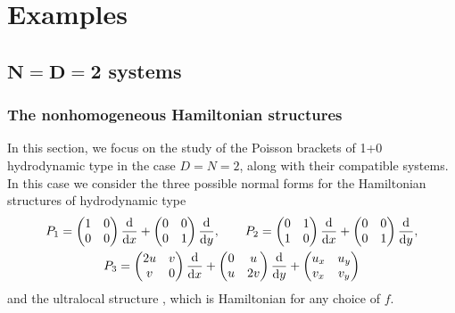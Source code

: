 \documentclass[pdftex]{sigma}
\numberwithin{equation}{section}
\begin{document}
\section{Examples}
\subsection[N=D=2 systems]{$\boldsymbol{N=D=2}$ systems}
\subsubsection{The nonhomogeneous Hamiltonian structures}
In this section, we focus on the study of the Poisson brackets of 1+0 hydrodynamic type in the case $D=N=2$, along with their compatible systems. In this case we consider the three possible normal forms for the Hamiltonian structures of hydrodynamic type \cite{ferapontov2011classification,mokhov2008classification}
\begin{gather*}
P_1=\begin{pmatrix} 1&0\\0&0\\ \end{pmatrix} \frac{\rm d}{{\rm d}x}+\begin{pmatrix} 0&0\\0&1\\ \end{pmatrix} \frac{\rm d}{{\rm d}y},\qquad
P_2=\begin{pmatrix} 0&1\\1&0\\ \end{pmatrix} \frac{\rm d}{{\rm d}x}+\begin{pmatrix} 0&0\\0&1\\ \end{pmatrix} \frac{\rm d}{{\rm d}y},\\
P_3=\begin{pmatrix} 2u&v\\v&0\\ \end{pmatrix} \frac{\rm d}{{\rm d}x}+\begin{pmatrix} 0&u\\u&2v\\ \end{pmatrix} \frac{\rm d}{{\rm d}y}+\begin{pmatrix} u_x&u_y\\v_x&v_y\\ \end{pmatrix}
\end{gather*}
and the ultralocal structure
,
which is Hamiltonian for any choice of $f$.
\end{document}
